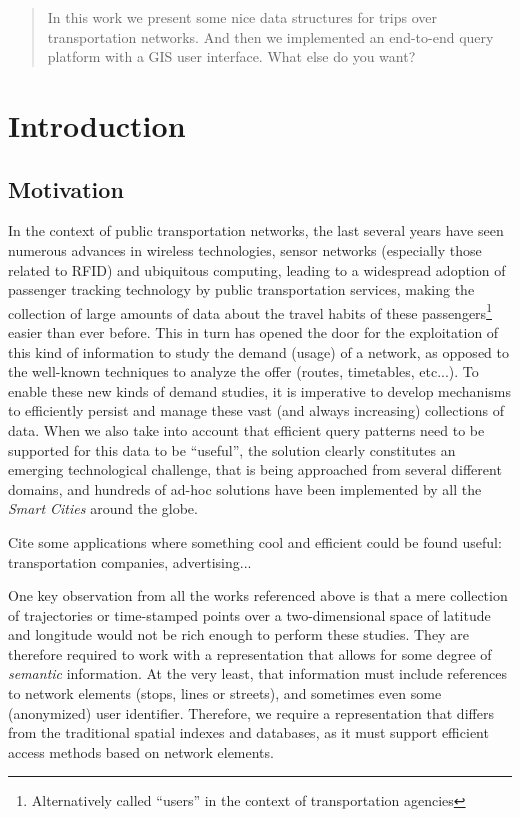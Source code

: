 \documentclass{UniVieCS_PhD} %
\begin{document}
    \Titlepage %
    \clearpage
	
	\pagebreak

	\tableofcontents %
	
	\pagebreak
	
	\begin{abstract}
		In this work we present some nice data structures for trips over transportation networks. And then we implemented an end-to-end query platform with a GIS user interface. What else do you want?
	\end{abstract}
	
	\section{Introduction}
	\subsection{Motivation}
	In the context of public transportation networks, the last several years have seen numerous advances in wireless technologies, sensor networks (especially those related to RFID) and ubiquitous computing, leading to a widespread adoption of passenger tracking technology by public transportation services, making the collection of large amounts of data about the travel habits of these passengers\footnote{Alternatively called ``users'' in the context of transportation agencies} easier than ever before.
	This in turn has opened the door for the exploitation of this kind of information to study the demand (usage) of a network, as opposed to the well-known techniques to analyze the offer (routes, timetables, etc...). 
	To enable these new kinds of demand studies, it is imperative to develop mechanisms to efficiently persist and manage these vast (and always increasing) collections of data. When we also take into account that efficient query patterns need to be supported for this data to be ``useful'', the solution clearly constitutes an emerging technological challenge, that is being approached from several different domains, and hundreds of ad-hoc solutions have been implemented by all the \textit{Smart Cities} around the globe.
	
	Cite some applications where something cool and efficient could be found useful: transportation companies, advertising...
	
	One key observation from all the works referenced above is that a mere collection of trajectories or time-stamped points over a two-dimensional space of latitude and longitude would not be rich enough to perform these studies. They are therefore required to work with a representation that allows for some degree of \textit{semantic} information. At the very least, that information must include references to network elements (stops, lines or streets), and sometimes even some (anonymized) user identifier. Therefore, we require a representation that differs from the traditional spatial indexes and databases, as it must support efficient access methods based on network elements.
	
\end{document}
